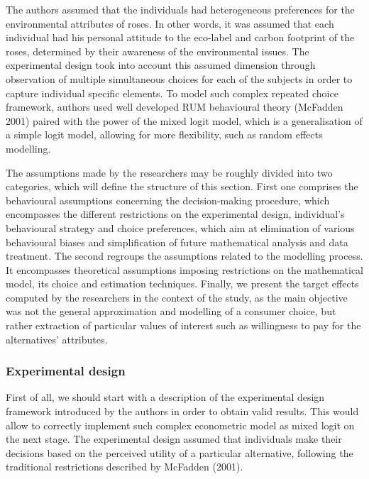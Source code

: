 \documentclass[12pt,]{article}
\begin{document}
The authors assumed that the individuals had heterogeneous preferences
for the environmental attributes of roses. In other words, it was
assumed that each individual had his personal attitude to the eco-label
and carbon footprint of the roses, determined by their awareness of the
environmental issues. The experimental design took into account this
assumed dimension through observation of multiple simultaneous choices
for each of the subjects in order to capture individual specific
elements. To model such complex repeated choice framework, authors used
well developed RUM behavioural theory (McFadden 2001) paired with the
power of the mixed logit model, which is a generalisation of a simple
logit model, allowing for more flexibility, such as random effects
modelling.

The assumptions made by the researchers may be roughly divided into two
categories, which will define the structure of this section. First one
comprises the behavioural assumptions concerning the decision-making
procedure, which encompasses the different restrictions on the
experimental design, individual's behavioural strategy and choice
preferences, which aim at elimination of various behavioural biases and
simplification of future mathematical analysis and data treatment. The
second regroups the assumptions related to the modelling process. It
encompasses theoretical assumptions imposing restrictions on the
mathematical model, its choice and estimation techniques. Finally, we
present the target effects computed by the researchers in the context of
the study, as the main objective was not the general approximation and
modelling of a consumer choice, but rather extraction of particular
values of interest such as willingness to pay for the alternatives'
attributes.

\hypertarget{experimental-design}{%
\subsubsection{Experimental design}\label{experimental-design}}

First of all, we should start with a description of the experimental
design framework introduced by the authors in order to obtain valid
results. This would allow to correctly implement such complex
econometric model as mixed logit on the next stage. The experimental
design assumed that individuals make their decisions based on the
perceived utility of a particular alternative, following the traditional
restrictions described by McFadden (2001).
\end{document}
